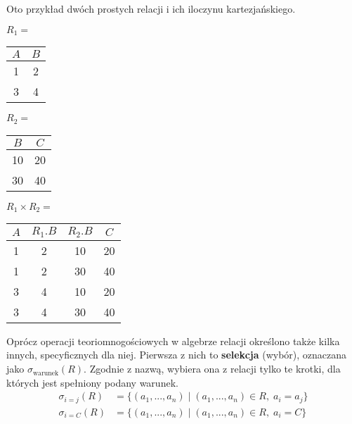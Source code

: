 \begin{example}
    Oto przykład dwóch prostych relacji i ich iloczynu kartezjańskiego.
    \begin{center}
        $R_1 = $
        \begin{tabular}{c|c}
            $A$ & $B$ \\ \hline
            1 & 2 \\
            3 & 4              
        \end{tabular}
        \qquad $R_2 = $
        \begin{tabular}{c|c}
            $B$ & $C$ \\ \hline
            10 & 20 \\
            30 & 40
        \end{tabular}
        \qquad $R_1 \times R_2 = $
        \begin{tabular}{c|c|c|c}
            $A$ & $R_1.B$ & $R_2.B$ & $C$ \\ \hline
            1 & 2 & 10 & 20 \\
            1 & 2 & 30 & 40 \\
            3 & 4 & 10 & 20 \\
            3 & 4 & 30 & 40 \\
        \end{tabular}
    \end{center}
\end{example}

Oprócz operacji teoriomnogościowych w algebrze relacji określono także kilka innych, specyficznych dla niej. Pierwsza z nich to \textbf{selekcja} (wybór), oznaczana jako $\sigma_{\text{warunek}}(R)$. Zgodnie z nazwą, wybiera ona z relacji tylko te krotki, dla których jest spełniony podany warunek.
\begin{align*}
    \sigma_{i=j}(R) &= \{(a_1, ..., a_n) \; | \; (a_1, ..., a_n) \in R, \; a_i = a_j \} \\
    \sigma_{i=C}(R) &= \{(a_1, ..., a_n) \; | \; (a_1, ..., a_n) \in R, \; a_i = C \}
\end{align*}

